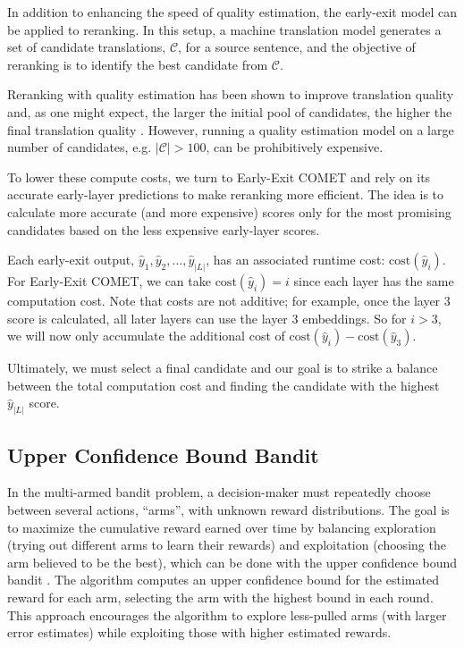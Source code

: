 In addition to enhancing the speed of quality estimation, the early-exit model can be applied to reranking. 
In this setup, a machine translation model generates a set of candidate translations, $\mathcal{C}$, for a source sentence, and
the objective of reranking is to identify the best candidate from $\mathcal{C}$.

Reranking with quality estimation has been shown to improve translation quality \citep{freitag-etal-2022-high} and, as one might expect, the larger the initial pool of candidates, the higher the final translation quality \citep{vernikos-popescu-belis-2024-dont}.
However, running a quality estimation model on a large number of candidates, e.g. $|\mathcal{C}| > 100$, can be prohibitively expensive. 


To lower these compute costs, we turn to Early-Exit COMET and rely on its accurate early-layer predictions to make reranking more efficient.
The idea is to calculate more accurate (and more expensive) scores only for the most promising candidates based on the less expensive early-layer scores.

Each early-exit output, $\hat{y}_1, \hat{y}_2, \ldots, \hat{y}_{|L|}$, has an associated runtime cost: $\mathrm{cost}(\hat{y}_i)$. For Early-Exit COMET, we can take $\mathrm{cost}(\hat{y}_i) = i$ since each layer has the same computation cost.
Note that costs are not additive; for example, once the layer $3$ score is calculated, all later layers can use the layer $3$ embeddings. So for $i>3$, we will now only accumulate the additional cost of $\mathrm{cost}(\hat{y}_{i}) - \mathrm{cost}(\hat{y}_{3})$.

Ultimately, we must select a final candidate
and our goal is to strike a balance between the total computation cost and finding the candidate with the highest $\hat{y}_{|L|}$ score.







\subsection{Upper Confidence Bound Bandit}
In the multi-armed bandit problem, a decision-maker must repeatedly choose between several actions, ``arms'', with unknown reward distributions.
The goal is to maximize the cumulative reward earned over time by balancing exploration (trying out different arms to learn their rewards) and exploitation (choosing the arm believed to be the best), which can be done with the upper confidence bound bandit \citep{auer2002using}.
The algorithm computes an upper confidence bound for the estimated reward for each arm, selecting the arm with the highest bound in each round.
This approach encourages the algorithm to explore less-pulled arms (with larger error estimates) while exploiting those with higher estimated rewards.

